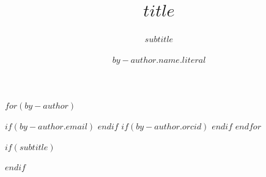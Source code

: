 $for(by-author)$
\author{$by-author.name.literal$}
$if(by-author.email)$
$endif$
$if(by-author.orcid)$
$endif$
$endfor$

\renewcommand{\shortauthors}{$if(shortauthors)$$shortauthors$$else$$for(by-author)$$by-author.name.family$$sep$, $endfor$$endif$}

\title{$title$}
$if(subtitle)$
\subtitle{$subtitle$}
$endif$
